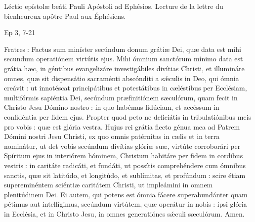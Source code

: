 \begin{paracol}{2}
Léctio epístolæ beáti Pauli Apóstoli ad Ephésios.
\switchcolumn
Lecture de la lettre du bienheureux apôtre Paul aux Éphésiens.
\switchcolumn*

Ep 3, 7-21
\switchcolumn

\switchcolumn*

Fratres : Factus sum miníster  secúndum donum grátiæ Dei, quæ data est mihi secundum operatiónem virtútis ejus. Mihi ómnium sanctórum mínimo data est grátia hæc, in géntibus evangelizáre investigábiles divítias Christi, et illumináre omnes, quæ sit dispensátio sacraménti abscónditi a sǽculis in Deo, qui ómnia creávit : ut innotéscat principátibus et potestátibus in cæléstibus per Ecclésiam, multifórmis sapiéntia Dei, secúndum præfinitiónem sæculórum, quam fecit in Christo Jesu Dómino nostro : in quo habémus fidúciam, et accéssum in confidéntia per fidem ejus. Propter quod peto ne deficiátis in tribulatiónibus meis pro vobis : quæ est glória vestra. Hujus rei grátia flecto génua mea ad Patrem Dómini nostri Jesu Christi, ex quo omnis patérnitas in cælis et in terra nominátur, ut det vobis secúndum divítias glóriæ suæ, virtúte corroborári per Spíritum ejus in interiórem hóminem, Christum habitáre per fidem in cordibus vestris : in caritáte radicáti, et fundáti, ut possítis comprehéndere cum ómnibus sanctis, quæ sit latitúdo, et longitúdo, et sublímitas, et profúndum : scire étiam supereminéntem sciéntiæ caritátem Christi, ut impleámini in omnem plenitúdinem Dei. Ei autem, qui potens est ómnia fácere superabundánter quam pétimus aut intellígimus, secúndum virtútem, quæ operátur in nobis : ipsi glória in Ecclésia, et in Christo Jesu, in omnes generatiónes sǽculi sæculórum. Amen.
\switchcolumn

\end{paracol}

